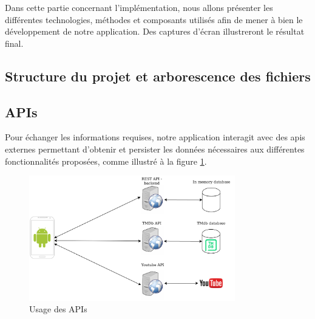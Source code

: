 Dans cette partie concernant l'implémentation, nous allons présenter les différentes technologies, méthodes et composants utilisés afin de mener à bien le développement de notre application. Des captures d'écran illustreront le résultat final.

\subsection{Structure du projet et arborescence des fichiers}

\subsection{APIs}
Pour échanger les informations requises, notre application interagit avec des \acrshort{api}s externes permettant d'obtenir et persister les données nécessaires aux différentes fonctionnalités proposées, comme illustré à la figure \ref{apis_usage}.
\begin{figure}
    \begin{center}
        \includegraphics[width=0.8\textwidth]{img/schemas/APIs.png}
    \end{center}
    \caption{Usage des APIs}
    \label{apis_usage}
\end{figure}

